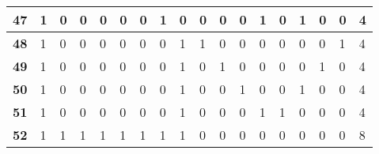\begin{center}
\begin{longtable}{|P{0.3cm}|P{0.3cm}|P{0.3cm}|P{0.3cm}|P{0.3cm}|P{0.3cm}|P{0.3cm}|P{0.3cm}|P{0.3cm}|P{0.3cm}|P{0.3cm}|P{0.3cm}|P{0.3cm}|P{0.3cm}|P{0.3cm}|P{0.3cm}|P{0.3cm}|P{1.4cm}|}
\textbf{47}                        & 1                     & 0                     & 0                     & 0                     & 0                     & 0                     & 1                     & 0                     & 0                     & 0                     & 0                     & 1                     & 0                     & 1                     & 0                     & 0                     & 4                     \\ \hline
\textbf{48}                        & 1                     & 0                     & 0                     & 0                     & 0                     & 0                     & 0                     & 1                     & 1                     & 0                     & 0                     & 0                     & 0                     & 0                     & 0                     & 1                     & 4                     \\ \hline
\textbf{49}                        & 1                     & 0                     & 0                     & 0                     & 0                     & 0                     & 0                     & 1                     & 0                     & 1                     & 0                     & 0                     & 0                     & 0                     & 1                     & 0                     & 4                     \\ \hline
\textbf{50}                        & 1                     & 0                     & 0                     & 0                     & 0                     & 0                     & 0                     & 1                     & 0                     & 0                     & 1                     & 0                     & 0                     & 1                     & 0                     & 0                     & 4                     \\ \hline
\textbf{51}                        & 1                     & 0                     & 0                     & 0                     & 0                     & 0                     & 0                     & 1                     & 0                     & 0                     & 0                     & 1                     & 1                     & 0                     & 0                     & 0                     & 4                     \\ \hline
\textbf{52}                        & 1                     & 1                     & 1                     & 1                     & 1                     & 1                     & 1                     & 1                     & 0                     & 0                     & 0                     & 0                     & 0                     & 0                     & 0                     & 0                     & 8                     \\ \hline

\end{longtable}
\end{center}
